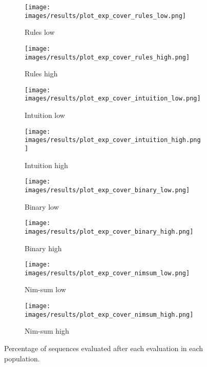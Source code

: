 \begin{landscape}
\begin{figure}[p]
	\begin{subfigure}{0.24\linewidth}
	\centering
	\texttt{[image: images/results/plot\_exp\_cover\_rules\_low.png]}
	\caption{Rules low}
	\label{fig:exp_cover_rules_low}
	\end{subfigure}
	\hfill
	\begin{subfigure}{0.24\linewidth}
	\centering
	\texttt{[image: images/results/plot\_exp\_cover\_rules\_high.png]}
	\caption{Rules high}
	\label{fig:exp_cover_rules_high}
	\end{subfigure}
	\begin{subfigure}{0.24\linewidth}
	\centering
	\texttt{[image: images/results/plot\_exp\_cover\_intuition\_low.png]}
	\caption{Intuition low}
	\label{fig:exp_cover_intuition_low}
	\end{subfigure}
	\hfill
	\begin{subfigure}{0.24\linewidth}
	\centering
	\texttt{[image: images/results/plot\_exp\_cover\_intuition\_high.png]}
	\caption{Intuition high}
	\label{fig:exp_cover_intuition_high}
	\end{subfigure}
	\begin{subfigure}{0.24\linewidth}
	\centering
	\texttt{[image: images/results/plot\_exp\_cover\_binary\_low.png]}
	\caption{Binary low}
	\label{fig:exp_cover_binary_low}
	\end{subfigure}
	\hfill
	\begin{subfigure}{0.24\linewidth}
	\centering
	\texttt{[image: images/results/plot\_exp\_cover\_binary\_high.png]}
	\caption{Binary high}
	\label{fig:exp_cover_binary_high}
	\end{subfigure}
	\begin{subfigure}{0.24\linewidth}
	\centering
	\texttt{[image: images/results/plot\_exp\_cover\_nimsum\_low.png]}
	\caption{Nim-sum low}
	\label{fig:exp_cover_nimsum_low}
	\end{subfigure}
	\hfill
	\begin{subfigure}{0.24\linewidth}
	\centering
	\texttt{[image: images/results/plot\_exp\_cover\_nimsum\_high.png]}
	\caption{Nim-sum high}
	\label{fig:exp_cover_nimsum_high}
	\end{subfigure}
	\caption[Percentage of sequences evaluated]{Percentage of sequences
	evaluated after each evaluation in each population.}
	\label{fig:exp_cover1}
\end{figure}
\end{landscape}


